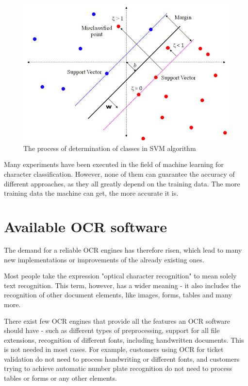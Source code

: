 \begin{figure}[H]
\centering
\includegraphics[width=0.7\linewidth]{img/svm.jpg}
\caption{The process of determination of classes in SVM algorithm \citep{svmAlgorithm}} \label{fig:1a}
\end{figure}

Many experiments have been executed in the field of machine learning for character classification. However, none of them can guarantee the accuracy of different approaches, as they all greatly depend on the training data. The more training data the machine can get, the more accurate it is. 

\section{Available OCR software}


 The demand for a reliable OCR engines has therefore risen, which lead to many new implementations or improvements of the already existing ones.

Most people take the expression "optical character recognition" to mean solely text recognition. This term, however, has a wider meaning - it also includes the recognition of other document elements, like images, forms, tables and many more.

There exist few OCR engines that provide all the features an OCR software should have - such as different types of preprocessing, support for all file extensions, recognition of different fonts, including handwritten documents. This is not needed in most cases. For example, customers using OCR for ticket validation do not need to process handwriting or different fonts, and customers trying to achieve automatic number plate recognition do not need to process tables or forms or any other elements.


